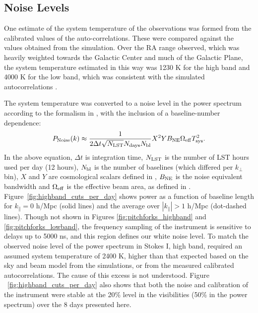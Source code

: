\documentclass[twocolumn, trackchanges]{aastex61}
\begin{document}
\subsection{Noise Levels}
\label{sec:Noise}

One estimate of the system temperature of the observations was formed from the
calibrated values of the auto-correlations.  These were compared against the
values obtained from the simulation.  Over the RA range observed, which was
heavily weighted towards the Galactic Center and much of the Galactic Plane, the
system temperature estimated in this way was 1230 K for the high band and 4000 K
for the low band, which was consistent with the simulated autocorrelations
\citep[][also see the public
\href{http://reionization.org/wp-content/uploads/2017/04/HERA19_Tsys_3April2017.pdf}{\underline{HERA
    Memo \#16}}]{deBoer17}.

The system temperature was converted to a noise level in the power spectrum
according to the formalism in \cite{Parsons.12a}, with the inclusion of a
baseline-number dependence:
\begin{equation}
P_{\rm Noise}(k) \approx \frac{1}{2\Delta t \sqrt{N_{\rm LST}} N_{\rm days} N_{\rm bl}} X^2 Y B_{\rm NE} \Omega_{\rm eff} T_{\rm sys}^2.
\end{equation}
In the above equation, $\Delta t$ is integration time, $N_{\rm LST}$ is the
number of LST hours used per day (12 hours), $N_{\rm bl}$ is the number of
baselines (which differed per $k_{\perp}$ bin), $X$ and $Y$ are cosmological
scalars defined in \cite{Parsons.12a}, $B_{\rm NE}$ is the noise equivalent
bandwidth and $\Omega_{\rm eff}$ is the effective beam area, as defined in
\cite{Parsons14}.  Figure~\ref{fig:highband_cuts_per_day} shows power as a
function of baseline length for $k_{\parallel}=0$ h/Mpc (solid lines) and the
average over $|k_{\parallel}|>1$ h/Mpc (dot-dashed lines).  Though not shown in
Figures \ref{fig:pitchforks_highband} and \ref{fig:pitchforks_lowband}, the
frequency sampling of the instrument is sensitive to delays up to 5000 ns, and
this region defines our white noise level.  To match the observed noise level of
the power spectrum in Stokes I, high band, required an assumed system
temperature of 2400 K, higher than that expected based on the sky and beam model
from the simulations, or from the measured calibrated autocorrelations.  The
cause of this excess is not understood.  Figure ~\ref{fig:highband_cuts_per_day}
also shows that both the noise and calibration of the instrument were stable at
the 20\% level in the visibilities (50\% in the power spectrum) over the 8 days
presented here.
\end{document}
